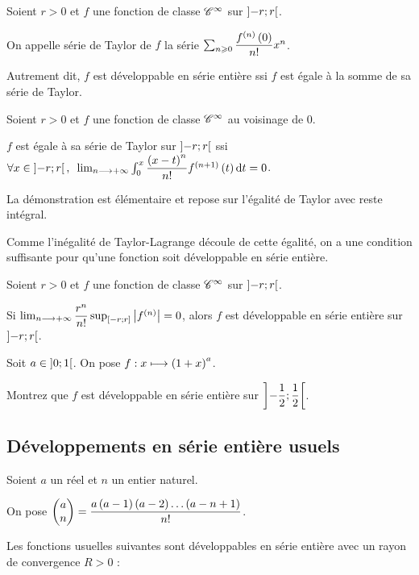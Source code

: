 \begin{defi}
Soient \(r>0\) et \(f\) une fonction de classe \(\classe{\infty}\) sur \(\intervee{-r}{r}\).

On appelle série de Taylor de \(f\) la série \(\sum_{n\geq0}\dfrac{f\deriv{n}\paren{0}}{n!}x^n\).
\end{defi}

Autrement dit, \(f\) est développable en série entière ssi \(f\) est égale à la somme de sa série de Taylor.

\begin{prop}
Soient \(r>0\) et \(f\) une fonction de classe \(\classe{\infty}\) au voisinage de \(0\).

\(f\) est égale à sa série de Taylor sur \(\intervee{-r}{r}\) ssi \(\quantifs{\forall x\in\intervee{-r}{r}}\lim_{n\to\pinf}\int_0^x\dfrac{\paren{x-t}^n}{n!}f\deriv{n+1}\paren{t}\odif{t}=0\).
\end{prop}

La démonstration est élémentaire et repose sur l'égalité de Taylor avec reste intégral.

Comme l'inégalité de Taylor-Lagrange découle de cette égalité, on a une condition suffisante pour qu'une fonction soit développable en série entière.

\begin{prop}
Soient \(r>0\) et \(f\) une fonction de classe \(\classe{\infty}\) sur \(\intervee{-r}{r}\).

Si \(\lim_{n\to\pinf}\dfrac{r^n}{n!}\sup_{\intervii{-r}{r}}\abs{f\deriv{n}}=0\), alors \(f\) est développable en série entière sur \(\intervee{-r}{r}\).
\end{prop}

\begin{exo}
Soit \(a\in\intervee{0}{1}\). On pose \(f:x\mapsto\paren{1+x}^a\).

Montrez que \(f\) est développable en série entière sur \(\intervee{-\dfrac{1}{2}}{\dfrac{1}{2}}\).
\end{exo}

\subsection{Développements en série entière usuels}

Soient \(a\) un réel et \(n\) un entier naturel.

On pose \(\binom{n}{a}=\dfrac{a\paren{a-1}\paren{a-2}\dots\paren{a-n+1}}{n!}\).

Les fonctions usuelles suivantes sont développables en série entière avec un rayon de convergence \(R>0\) :

